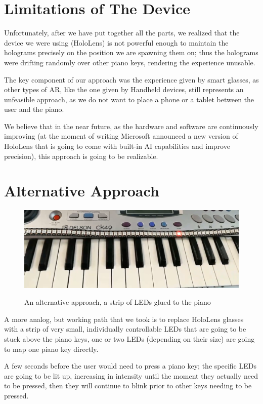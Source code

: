 \documentclass[12 pct]{report}
\begin{document}
\section{Limitations of The Device}

Unfortunately, after we have put together all the parts, we realized that the device we were using (HoloLens) is not powerful enough to maintain the holograms precisely on the position we are spawning them on; thus the holograms were drifting randomly over other piano keys, rendering the experience unusable.

The key component of our approach was the experience given by smart glasses, as other types of AR, like the one given by Handheld devices, still represents an unfeasible approach, as we do not want to place a phone or a tablet between the user and the piano.

We believe that in the near future, as the hardware and software are continuously improving (at the moment of writing Microsoft announced a new version of HoloLens that is going to come with built-in AI capabilities and improve precision), this approach is going to be realizable.

\section{Alternative Approach}

\begin{figure}[H]
\includegraphics[width=1.0\textwidth]{piano-leds}
\centering
\label{fig:feature-points}
\caption{An alternative approach, a strip of LEDs glued to the piano}
\end{figure}

A more analog, but working path that we took is to replace HoloLens glasses with a strip of very small, individually controllable LEDs that are going to be stuck above the piano keys, one or two LEDs (depending on their size) are going to map one piano key directly. 

A few seconds before the user would need to press a piano key; the specific LEDs are going to be lit up, increasing in intensity until the moment they actually need to be pressed, then they will continue to blink prior to other keys needing to be pressed.
\end{document}
